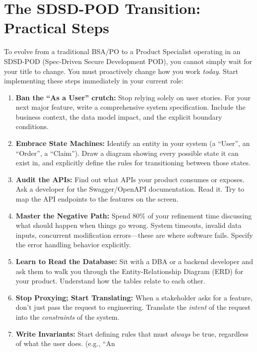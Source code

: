 \bigskip

\section{The SDSD-POD Transition: Practical
Steps}\label{the-sdsd-pod-transition-practical-steps}

To evolve from a traditional BSA/PO to a Product Specialist operating in
an SDSD-POD (Spec-Driven Secure Development POD), you cannot simply wait
for your title to change. You must proactively change how you work
\emph{today}. Start implementing these steps immediately in your current
role:

\begin{enumerate}
\def\labelenumi{\arabic{enumi}.}
\tightlist
\item
  \textbf{Ban the ``As a User'' crutch:} Stop relying solely on user
  stories. For your next major feature, write a comprehensive system
  specification. Include the business context, the data model impact,
  and the explicit boundary conditions.
\item
  \textbf{Embrace State Machines:} Identify an entity in your system (a
  ``User'', an ``Order'', a ``Claim''). Draw a diagram showing every
  possible state it can exist in, and explicitly define the rules for
  transitioning between those states.
\item
  \textbf{Audit the APIs:} Find out what APIs your product consumes or
  exposes. Ask a developer for the Swagger/OpenAPI documentation. Read
  it. Try to map the API endpoints to the features on the screen.
\item
  \textbf{Master the Negative Path:} Spend 80\% of your refinement time
  discussing what should happen when things go wrong. System timeouts,
  invalid data inputs, concurrent modification errors---these are where
  software fails. Specify the error handling behavior explicitly.
\item
  \textbf{Learn to Read the Database:} Sit with a DBA or a backend
  developer and ask them to walk you through the Entity-Relationship
  Diagram (ERD) for your product. Understand how the tables relate to
  each other.
\item
  \textbf{Stop Proxying; Start Translating:} When a stakeholder asks for
  a feature, don't just pass the request to engineering. Translate the
  \emph{intent} of the request into the \emph{constraints} of the
  system.
\item
  \textbf{Write Invariants:} Start defining rules that must
  \emph{always} be true, regardless of what the user does. (e.g., ``An

\end{enumerate}
